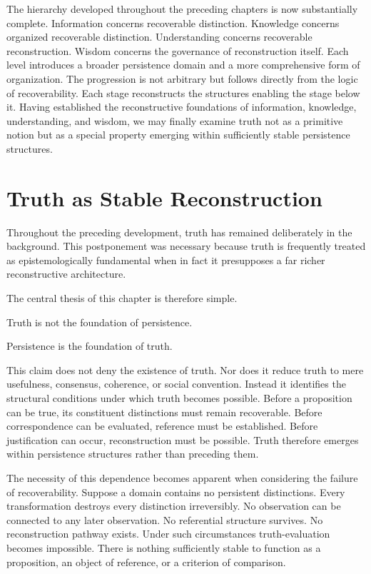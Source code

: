 \documentclass[12pt,oneside]{article}
\theoremstyle{definition}
\begin{document}
The hierarchy developed throughout the preceding chapters is now substantially complete. Information concerns recoverable distinction. Knowledge concerns organized recoverable distinction. Understanding concerns recoverable reconstruction. Wisdom concerns the governance of reconstruction itself. Each level introduces a broader persistence domain and a more comprehensive form of organization. The progression is not arbitrary but follows directly from the logic of recoverability. Each stage reconstructs the structures enabling the stage below it. Having established the reconstructive foundations of information, knowledge, understanding, and wisdom, we may finally examine truth not as a primitive notion but as a special property emerging within sufficiently stable persistence structures.

\section{Truth as Stable Reconstruction}

Throughout the preceding development, truth has remained deliberately in the background. This postponement was necessary because truth is frequently treated as epistemologically fundamental when in fact it presupposes a far richer reconstructive architecture.

The central thesis of this chapter is therefore simple.

Truth is not the foundation of persistence.

Persistence is the foundation of truth.

This claim does not deny the existence of truth. Nor does it reduce truth to mere usefulness, consensus, coherence, or social convention. Instead it identifies the structural conditions under which truth becomes possible. Before a proposition can be true, its constituent distinctions must remain recoverable. Before correspondence can be evaluated, reference must be established. Before justification can occur, reconstruction must be possible. Truth therefore emerges within persistence structures rather than preceding them.

The necessity of this dependence becomes apparent when considering the failure of recoverability. Suppose a domain contains no persistent distinctions. Every transformation destroys every distinction irreversibly. No observation can be connected to any later observation. No referential structure survives. No reconstruction pathway exists. Under such circumstances truth-evaluation becomes impossible. There is nothing sufficiently stable to function as a proposition, an object of reference, or a criterion of comparison.
\end{document}
